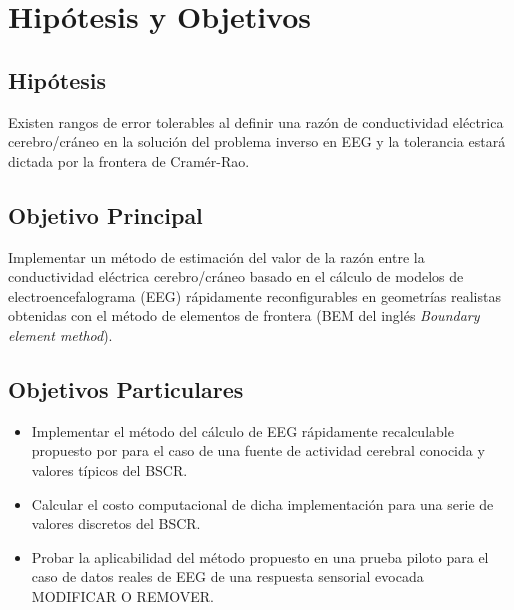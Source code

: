 %
\chapter{Hipótesis y Objetivos}
\label{sec:obj}

\section{Hipótesis}
\label{sec:obj:hipotesis}

Existen rangos de error tolerables al definir una razón de conductividad eléctrica cerebro/cráneo en la solución del problema inverso en EEG y la tolerancia estará dictada por la frontera de Cramér-Rao.

\section{Objetivo Principal}
\label{sec:obj:main}


Implementar un método de estimación del valor de la razón entre la conductividad eléctrica cerebro/cráneo basado en el cálculo de modelos de electroencefalograma (EEG) rápidamente reconfigurables en geometrías realistas obtenidas con el método de elementos de frontera (BEM del inglés \emph{Boundary element method}).

\section{Objetivos Particulares}
\label{sec:obj:individual}

\begin{itemize}
	\item Implementar el método del cálculo de EEG rápidamente recalculable propuesto por \citeauthor{Ermer2001}\cite{Ermer2001} para el caso de una fuente de actividad cerebral conocida y valores típicos del BSCR.
	\item Calcular el costo computacional de dicha implementación para una serie de valores discretos del BSCR.
	\item Probar la aplicabilidad del método propuesto en una prueba piloto para el caso de datos reales de EEG de una respuesta sensorial evocada MODIFICAR O REMOVER.
\end{itemize}